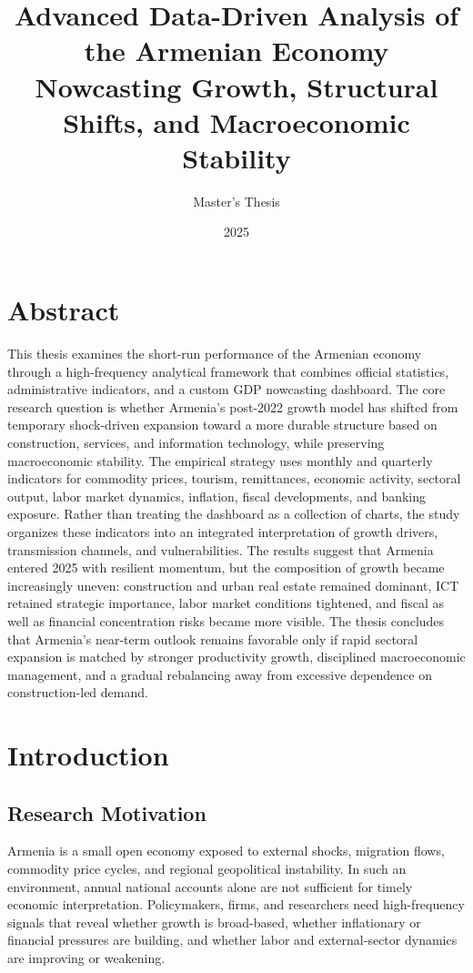 \documentclass[12pt,a4paper]{report}
\title{Advanced Data-Driven Analysis of the Armenian Economy \\ \large Nowcasting Growth, Structural Shifts, and Macroeconomic Stability}
\author{Master's Thesis}
\date{2025}
\begin{document}
\maketitle
\tableofcontents

\chapter*{Abstract}
This thesis examines the short-run performance of the Armenian economy through a high-frequency analytical framework that combines official statistics, administrative indicators, and a custom GDP nowcasting dashboard. The core research question is whether Armenia's post-2022 growth model has shifted from temporary shock-driven expansion toward a more durable structure based on construction, services, and information technology, while preserving macroeconomic stability. The empirical strategy uses monthly and quarterly indicators for commodity prices, tourism, remittances, economic activity, sectoral output, labor market dynamics, inflation, fiscal developments, and banking exposure. Rather than treating the dashboard as a collection of charts, the study organizes these indicators into an integrated interpretation of growth drivers, transmission channels, and vulnerabilities. The results suggest that Armenia entered 2025 with resilient momentum, but the composition of growth became increasingly uneven: construction and urban real estate remained dominant, ICT retained strategic importance, labor market conditions tightened, and fiscal as well as financial concentration risks became more visible. The thesis concludes that Armenia's near-term outlook remains favorable only if rapid sectoral expansion is matched by stronger productivity growth, disciplined macroeconomic management, and a gradual rebalancing away from excessive dependence on construction-led demand.

\chapter{Introduction}
\section{Research Motivation}
Armenia is a small open economy exposed to external shocks, migration flows, commodity price cycles, and regional geopolitical instability. In such an environment, annual national accounts alone are not sufficient for timely economic interpretation. Policymakers, firms, and researchers need high-frequency signals that reveal whether growth is broad-based, whether inflationary or financial pressures are building, and whether labor and external-sector dynamics are improving or weakening.
\end{document}

